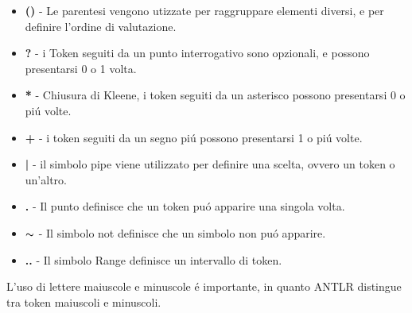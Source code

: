 \documentclass[../../main.tex]{subfiles}
\begin{document}
\begin{itemize}
    \item \textbf{()} - Le parentesi vengono utizzate per raggruppare elementi diversi, e per definire l'ordine di valutazione.
    \item \textbf{?} - i Token seguiti da un punto interrogativo sono opzionali, e possono presentarsi 0 o 1 volta.
    \item \textbf{*} - Chiusura di Kleene, i token seguiti da un asterisco possono presentarsi 0 o piú volte.
    \item \textbf{+} - i token seguiti da un segno piú possono presentarsi 1 o piú volte.
    \item \textbf{|} - il simbolo pipe viene utilizzato per definire una scelta, ovvero un token o un'altro.
    \item \textbf{.} - Il punto definisce che un token puó apparire una singola volta.
    \item \textbf{$\thicksim$ } - Il simbolo not definisce che un simbolo non puó apparire.
    \item \textbf{..} - Il simbolo Range definisce un intervallo di token.
\end{itemize}
L'uso di lettere maiuscole e minuscole é importante, in quanto ANTLR distingue tra token maiuscoli e minuscoli.\\
\cite{amslaurea2372}
\end{document}

